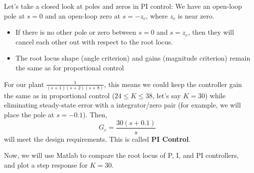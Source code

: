 \documentclass{book}
\begin{document}
Let's take a closed look at poles and zeros in PI control: We have an open-loop pole at $ s=0 $ and an open-loop zero at $ s=-z_c $, where $ z_c $ is near zero.
\begin{itemize}
	\item If there is no other pole or zero between $ s=0 $ and $ s=z_c $, then they will cancel each other out with respect to the root locus.
	\item The root locus shape (angle criterion) and gains (magnitude criterion) remain the same as for proportional control
\end{itemize} 
For our plant $ \frac{1}{(s+1)(s+2)(s+8)} $, this means we could keep the controller gain the same as in proportional control ($ 24 \leq K\leq 38 $, let's say $ K=30 $) while eliminating steady-state error with a integrator/zero pair (for example, we will place the pole at $ s=-0.1 $). Then,
\[ G_c = \frac{30(s+0.1)}{s} \]
will meet the design requirements. This is called \textbf{PI Control}.

Now, we will use Matlab to compare the root locus of P, I, and PI controllers, and plot a step response for $ K=30 $.
\end{document}
